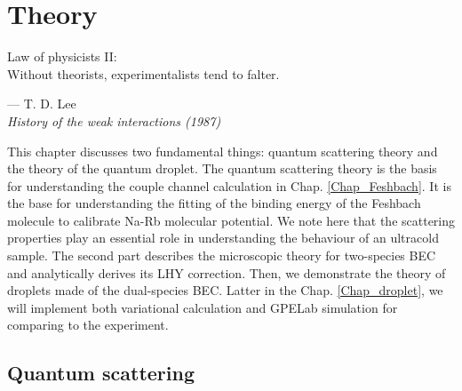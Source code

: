 \chapter{Theory}
\label{Chap:theory}

\setlength{\unitlength}{1pt}
\setlength{\epigraphwidth}{10cm}
\epigraph{Law of physicists II: \\ Without theorists, experimentalists tend to falter. \cite{Lee:1992ui}}{--- T. D. Lee\\ \textit{History of the weak interactions (1987)}}

This chapter discusses two fundamental things: quantum scattering theory and the theory of the quantum droplet. The quantum scattering theory is the basis for understanding the couple channel calculation in Chap. \ref{Chap_Feshbach}. It is the base for understanding the fitting of the binding energy of the Feshbach molecule to calibrate Na-Rb molecular potential. We note here that the scattering properties play an essential role in understanding the behaviour of an ultracold sample. The second part describes the microscopic theory for two-species BEC and analytically derives its LHY correction. Then, we demonstrate the theory of droplets made of the dual-species BEC. Latter in the Chap. \ref{Chap_droplet}, we will implement both variational calculation and GPELab simulation for comparing to the experiment.

\section{Quantum scattering}
\label{sec:quan_scat}

